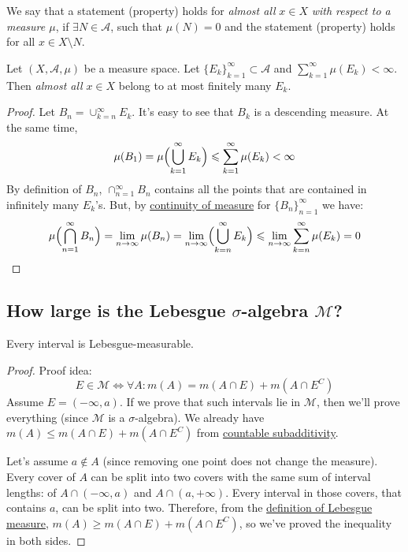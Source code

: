 \begin{definition}
    We say that a statement (property) holds for \textit{almost all} $x \in X$
    \textit{with respect to a measure $\mu$}, if
    $\exists N \in \mathcal{A}$, such that $\mu(N) = 0$ and the statement (property)
    holds for all $x \in X \setminus N$.
\end{definition}
\begin{lemma}
    Let $(X, \mathcal{A}, \mu)$ be a measure space. Let
    $\{E_k\}_{k=1}^\infty \subset \mathcal{A}$ and $\sum_{k=1}^\infty \mu(E_k) < \infty$.
    Then \textit{almost all} $x \in X$ belong to at most finitely many $E_k$.
\end{lemma}
\begin{proof}
    Let $B_n = \cup_{k=n}^\infty E_k$. It's easy to see that $B_k$ is a descending measure.
    At the same time,
    \[ \mu(B_1) = \mu\Bigl(\bigcup_{k=1}^\infty E_k\Bigr) \le \sum_{k=1}^\infty \mu(E_k) < \infty \]
    By definition of $B_n$, $\cap_{n=1}^\infty B_n$ contains all the points
    that are contained in infinitely many $E_k$'s. But, by \hyperref[the:continuityOfMeasure]{continuity of measure} 
    for $\{B_n\}_{n=1}^\infty$ we have:
    \[ 
        \mu\Bigl(\bigcap_{n=1}^\infty B_n\Bigr) =
        \lim_{n \to \infty} \mu(B_n) =
        \lim_{n \to \infty} \Bigl(\bigcup_{k=n}^\infty E_k\Bigr) \le
        \lim_{n \to \infty} \sum_{k=n}^\infty \mu(E_k) = 0
    \]
\end{proof}

\subsection{How large is the Lebesgue $\sigma$-algebra $\mathcal{M}$?}
\begin{proposition}
    \label{prop:intervalsAreMeasurable}
    Every interval is Lebesgue-measurable.
\end{proposition}
\begin{proof}
    Proof idea:
    \[ 
        E \in \mathcal{M} \Longleftrightarrow 
        \forall A: m(A) = m(A \cap E) + m(A \cap E^C)
    \]
    Assume $E = (-\infty, a)$. If we prove that such intervals lie in $\mathcal{M}$, 
    then we'll prove everything (since $\mathcal{M}$ is a $\sigma$-algebra).
    We already have $m(A) \le m(A \cap E) + m(A \cap E^C)$ from \hyperref[the:countableSubadditivity]{countable subadditivity}.

    Let's assume $a \not\in A$ (since removing one point does not change the measure).
    Every cover of $A$ can be split into two covers with the same sum of interval lengths: of
    $A \cap (-\infty, a)$ and $A \cap (a, +\infty)$. Every interval in those
    covers, that contains $a$, can be split into two. Therefore,
    from the \hyperref[def:lebesgueOuterMeasure]{definition of Lebesgue measure}, 
    $m(A) \ge m(A \cap E) + m(A \cap E^C)$, so we've proved the inequality in both sides.
\end{proof}